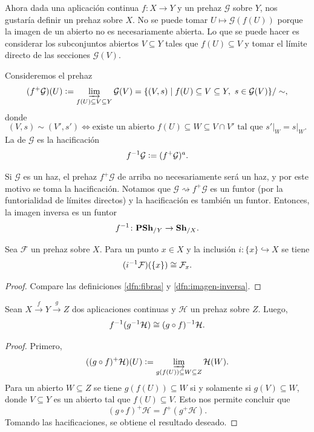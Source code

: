 \documentclass{article}
\numberwithin{equation}{section}
\theoremstyle{definition}
\begin{document}
Ahora dada una aplicación continua $f\colon X\to Y$ y un prehaz $\mathcal{G}$
sobre $Y$, nos gustaría definir un prehaz sobre $X$. No se puede tomar
$U \mapsto \mathcal{G} (f (U))$ porque la imagen de un abierto no es
necesariamente abierta. Lo que se puede hacer es considerar los subconjuntos
abiertos $V \subseteq Y$ tales que $f (U) \subseteq V$ y tomar el límite directo
de las secciones $\mathcal{G} (V)$.

\begin{definicion}
  \label{dfn:imagen-inversa}
  Consideremos el prehaz
  \[ (f^+ \mathcal{G}) (U) \mathrel{\mathop:}=
     \varinjlim_{f (U) \subseteq V \subseteq Y} \mathcal{G} (V) =
     \{ (V,s) \mid f (U) \subseteq V \subseteq Y, ~ s \in \mathcal{G} (V) \}/\sim, \]
  donde
  \[ (V,s) \sim (V',s') \iff
     \text{existe un abierto }f (U) \subseteq W \subseteq V\cap V'
     \text{ tal que }
     \left.s'\right|_W = \left.s\right|_W. \]
  La  de $\mathcal{G}$ es la hacificación
  $$f^{-1} \mathcal{G} \mathrel{\mathop:}= (f^+ \mathcal{G})^a.$$
\end{definicion}

Si $\mathcal{G}$ es un haz, el prehaz $f^+ \mathcal{G}$ de arriba no
necesariamente será un haz, y por este motivo se toma la hacificación.
Notamos que $\mathcal{G} \rightsquigarrow f^+ \mathcal{G}$ es un funtor
(por la funtorialidad de límites directos) y la hacificación es también
un funtor. Entonces, la imagen inversa es un funtor
$$f^{-1}\colon \text{\bf PSh}_{/Y} \to \text{\bf Sh}_{/X}.$$

\begin{observacion}
  \label{obs:imagen-inversa-y-fibras}
  Sea $\mathcal{F}$ un prehaz sobre $X$. Para un punto $x \in X$ y la inclusión
  $i\colon \{ x \} \hookrightarrow X$ se tiene
  $$(i^{-1} \mathcal{F}) (\{ x \}) \cong \mathcal{F}_x.$$

  \begin{proof}
    Compare las definiciones \ref{dfn:fibras} y \ref{dfn:imagen-inversa}.
  \end{proof}
\end{observacion}

\begin{observacion}
  \label{obs:imagen-inversa-dos-aplicaciones}
  Sean $X \xrightarrow{f} Y \xrightarrow{g} Z$ dos aplicaciones continuas y
  $\mathcal{H}$ un prehaz sobre $Z$. Luego,
  $$f^{-1} (g^{-1} \mathcal{H}) \cong (g\circ f)^{-1} \mathcal{H}.$$

  \begin{proof}
    Primero,
    $$((g\circ f)^+ \mathcal{H}) (U) \mathrel{\mathop:}= \varinjlim_{g (f (U)) \subseteq W \subseteq Z} \mathcal{H} (W).$$
    Para un abierto $W \subseteq Z$ se tiene $g (f (U)) \subseteq W$
    si y solamente si $g (V) \subseteq W$, donde $V \subseteq Y$ es un abierto
    tal que $f (U) \subseteq V$. Esto nos permite concluir que
    $$(g\circ f)^+ \mathcal{H} = f^+ (g^+ \mathcal{H}).$$
    Tomando las hacificaciones, se obtiene el resultado deseado.
  \end{proof}
\end{observacion}
\end{document}
